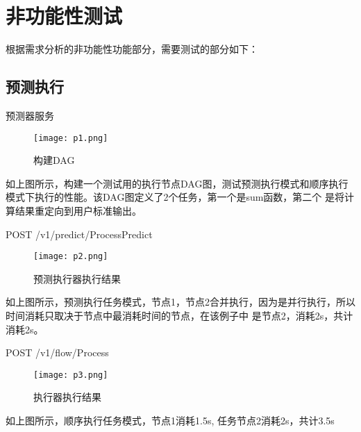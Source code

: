 \section{非功能性测试}

根据需求分析的非功能性功能部分，需要测试的部分如下：


\subsection{预测执行}

预测器服务

\begin{figure}[H]
    \centering
    \texttt{[image: p1.png]}
    \caption{构建DAG}
    \label{fig:6-3-2}
\end{figure}

如上图所示，构建一个测试用的执行节点DAG图，测试预测执行模式和顺序执行模式下执行的性能。该DAG图定义了2个任务，第一个是sum函数，第二个
是将计算结果重定向到用户标准输出。


POST /v1/predict/ProcessPredict

\begin{figure}[H]
    \centering
    \texttt{[image: p2.png]}
    \caption{预测执行器执行结果}
    \label{fig:6-3-3}
\end{figure}

如上图所示，预测执行任务模式，节点1，节点2合并执行，因为是并行执行，所以时间消耗只取决于节点中最消耗时间的节点，在该例子中
是节点2，消耗2s，共计消耗2s。

POST /v1/flow/Process

\begin{figure}[H]
    \centering
    \texttt{[image: p3.png]}
    \caption{执行器执行结果}
    \label{fig:6-3-3}
\end{figure}

如上图所示，顺序执行任务模式，节点1消耗1.5s, 任务节点2消耗2s，共计3.5s





